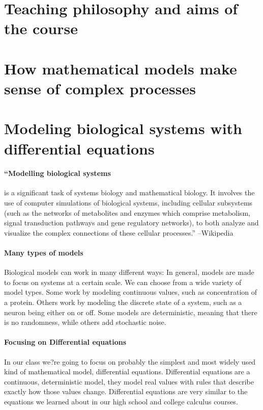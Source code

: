 \section{Teaching philosophy and aims of the course}


\section{How mathematical models make sense of complex processes}




\section{Modeling biological systems with differential equations}
\paragraph{``Modelling biological systems} is a significant task of systems biology and mathematical biology. It involves the use of computer simulations of biological systems, including cellular subsystems (such as the networks of metabolites and enzymes which comprise metabolism, signal transduction pathways and gene regulatory networks), to both analyze and visualize the complex connections of these cellular processes.'' --Wikipedia

\paragraph{Many types of models} Biological models can work in many different ways:  In general, models are made to focus on systems at a certain scale.  We can choose from a wide variety of model types. Some work by modeling continuous values, such as concentration of a protein.  Others work by modeling the discrete state of a system, such as a neuron being either on or off.  Some models are deterministic, meaning that there is no randomness, while others add stochastic noise.

\paragraph{Focusing on Differential equations} In our class we?re going to focus on probably the simplest and most widely used kind of mathematical model, differential equations.  Differential equations are a continuous, deterministic model, they model real values with rules that describe exactly how those values change.  Differential equations are very similar to the equations we learned about in our high school and college calculus courses.

